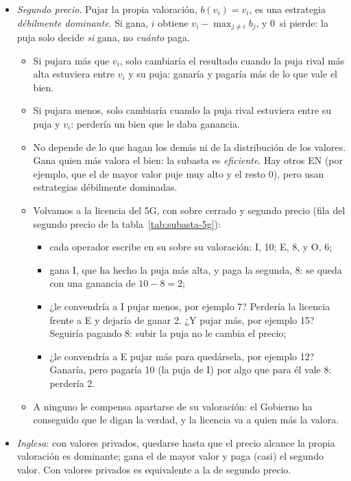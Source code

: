 \documentclass[11pt]{article}
\begin{document}
\begin{itemize}
\item \emph{Segundo precio}. Pujar la propia valoración, $b(v_i)=v_i$, es una estrategia \emph{débilmente dominante}\nocite{Vickrey1961Counterspeculation}. Si gana, $i$ obtiene $v_i-\max_{j\neq i}b_j$, y 0~si pierde: la puja solo decide \emph{si} gana, no \emph{cuánto} paga.
  \begin{itemize}
  \item Si pujara más que $v_i$, solo cambiaría el resultado cuando la puja rival más alta estuviera entre $v_i$ y su puja: ganaría y pagaría más de lo que vale el bien.
  \item Si pujara menos, solo cambiaría cuando la puja rival estuviera entre su puja y $v_i$: perdería un bien que le daba ganancia.
  \item No depende de lo que hagan los demás ni de la distribución de los valores. Gana quien más valora el bien: la subasta es \emph{eficiente}. Hay otros EN (por ejemplo, que el de mayor valor puje muy alto y el resto 0), pero usan estrategias débilmente dominadas.
  \item Volvamos a la licencia del 5G, con sobre cerrado y segundo precio (fila del segundo precio de la tabla~\ref{tab:subasta-5g}):
    \begin{itemize}
    \item cada operador escribe en su sobre su valoración: \textup{I}, 10; E, 8, y O, 6;
    \item gana \textup{I}, que ha hecho la puja más alta, y paga la segunda, 8: se queda con una ganancia de $10-8=2$;
    \item ¿le convendría a \textup{I} pujar menos, por ejemplo 7? Perdería la licencia frente a E y dejaría de ganar 2. ¿Y pujar más, por ejemplo 15? Seguiría pagando 8: subir la puja no le cambia el precio;
    \item ¿le convendría a E pujar más para quedársela, por ejemplo 12? Ganaría, pero pagaría 10 (la puja de \textup{I}) por algo que para él vale 8: perdería 2.
    \end{itemize}
  \item A ninguno le compensa apartarse de su valoración: el Gobierno ha conseguido que le digan la verdad, y la licencia va a quien más la valora.
  \end{itemize}
\item \emph{Inglesa}: con valores privados, quedarse hasta que el precio alcance la propia valoración es dominante; gana el de mayor valor y paga (casi) el segundo valor. Con valores privados es equivalente a la de segundo precio.

\end{itemize}
\end{document}
